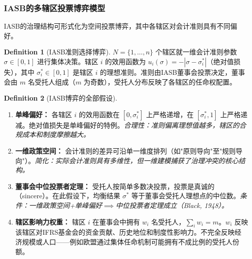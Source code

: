 \documentclass[12pt,a4paper]{ctexart}
\theoremstyle{definition}
\newtheorem{definition}{Definition}[section]
\theoremstyle{remark}
\begin{document}
\subsubsection{IASB的多辖区投票博弈模型}

IASB的治理结构可形式化为空间投票博弈，其中各辖区对会计准则具有不同偏好。

\begin{definition}[IASB准则选择博弈]
$N = \{1, \ldots, n\}$ 个辖区就一维会计准则参数 $\sigma \in [0,1]$ 进行集体决策。辖区 $i$ 的效用函数为 $u_i(\sigma) = -|\sigma - \sigma_i^*|$（绝对值损失），其中 $\sigma_i^* \in [0,1]$ 是辖区 $i$ 的理想准则。准则由IASB董事会投票决定，董事会由 $m$ 名受托人组成（$m$ 为奇数），受托人分布反映了各辖区的任命权配置。
\end{definition}

\begin{definition}[IASB博弈的全部假设]
\label{def:iasb-assumptions}
\begin{enumerate}[label=\textbf{I\arabic*}, leftmargin=*, itemsep=4pt]
\item \textbf{单峰偏好：} 各辖区 $i$ 的效用函数在 $[0, \sigma_i^*]$ 上严格递增，在 $[\sigma_i^*, 1]$ 上严格递减。绝对值损失是单峰偏好的特例。\hfill\textit{合理性：准则偏离理想值越多，辖区的合规成本和制度摩擦越大。}

\item \textbf{一维政策空间：} 会计准则的差异可沿单一维度排列（如"原则导向"至"规则导向"）。\hfill\textit{简化：实际会计准则具有多维性，但一维建模捕获了治理冲突的核心结构。}

\item \textbf{董事会中位投票者定理：} 受托人按简单多数决投票，投票是真诚的（sincere）。在此假设下，均衡结果 $\sigma^*$ 等于董事会受托人理想点的中位数。\hfill\textit{条件：一维政策空间+单峰偏好$\implies$中位投票者定理成立（Black, 1948）。}

\item \textbf{辖区影响力权重：} 辖区 $i$ 在董事会中拥有 $w_i$ 名受托人，$\sum_i w_i = m$。$w_i$ 反映该辖区对IFRS基金会的资金贡献、历史地位和制度性影响力。不完全反映经济规模或人口——例如欧盟通过集体任命机制可能拥有不成比例的受托人份额。
\end{enumerate}
\end{definition}
\end{document}
